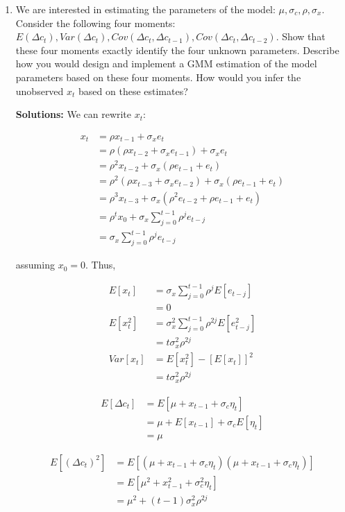 \documentclass{article}
\begin{document}
\begin{enumerate}

\item We are interested in estimating the parameters of the model: $\mu, \sigma_c, \rho, \sigma_x$. Consider the following four moments: $E(\Delta c_t), Var(\Delta c_t), Cov(\Delta c_t, \Delta c_{t-1}), Cov(\Delta c_t, \Delta c_{t-2})$. Show that these four moments exactly identify the four unknown parameters. Describe how you would design and implement a GMM estimation of the model parameters based on these four moments. How would you infer the unobserved $x_t$ based on these estimates?

\bigskip

\textbf{Solutions:} We can rewrite $x_t$:

\begin{align*}
x_{t}
&= \rho x_{t-1} + \sigma_x e_{t} \\
&= \rho (\rho x_{t-2} + \sigma_x e_{t-1}) + \sigma_x e_{t} \\
&= \rho^2x_{t-2} + \sigma_x (\rho e_{t-1} + e_t)\\
&= \rho^2(\rho x_{t-3} + \sigma_x e_{t-2}) + \sigma_x (\rho e_{t-1} + e_t)\\
&= \rho^3 x_{t-3} + \sigma_x (\rho^2 e_{t-2} + \rho e_{t-1} + e_t)\\
&= \rho^t x_0 + \sigma_x \sum_{j=0}^{t-1} \rho^j e_{t-j}\\
&= \sigma_x \sum_{j=0}^{t-1} \rho^j e_{t-j}
\end{align*}

assuming $x_0 = 0$.  Thus, 

\begin{align*}
E[x_t] 
&= \sigma_x \sum_{j=0}^{t-1} \rho^j E[e_{t-j}] \\
&= 0\\
E[x_t^2] 
&= \sigma_x^2 \sum_{j=0}^{t-1} \rho^{2j} E[e_{t-j}^2]\\
&= t\sigma_x^2 \rho^{2j}\\
Var[x_t] 
&= E[x_t^2] - [E[x_t]]^2 \\
&= t\sigma_x^2 \rho^{2j}
\end{align*} 

\begin{align*}
E[\Delta c_t] 
&= E[\mu + x_{t-1} + \sigma_c \eta_t]\\
&= \mu + E[x_{t-1}] + \sigma_c E[\eta_t]\\
&= \mu
\end{align*}

\begin{align*}
E[(\Delta c_t)^2] 
&= E[(\mu + x_{t-1} + \sigma_c \eta_t)(\mu + x_{t-1} + \sigma_c \eta_t)]\\
&= E[\mu^2 + x_{t-1}^2 + \sigma_c^2 \eta_t]\\
&= \mu^2 + (t-1)\sigma_x^2 \rho^{2j}
\end{align*}


\end{enumerate}
\end{document}
